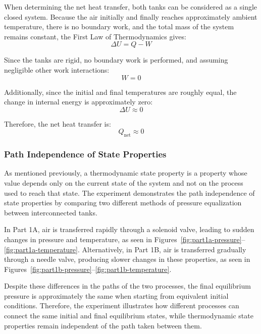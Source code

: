 \documentclass[12pt,letterpaper]{article}
\begin{document}
When determining the net heat transfer, both tanks can be
considered as a single closed system. Because the air
initially and finally reaches approximately ambient
temperature, there is no boundary work, and the total mass
of the system remains constant, the First Law of
Thermodynamics gives:
\begin{equation}
    \Delta U = Q - W
\end{equation}

Since the tanks are rigid, no boundary work is performed,
and assuming negligible other work interactions:
\begin{equation}
    W = 0
\end{equation}

Additionally, since the initial and final temperatures
are roughly equal, the change in internal energy
is approximately zero:
\begin{equation}
    \Delta U \approx 0
\end{equation}

Therefore, the net heat transfer is:
\begin{equation}
    \boxed{Q_{\mathrm{net}} \approx 0}
\end{equation}

\subsubsection{Path Independence of State Properties}
As mentioned previously, a thermodynamic state property is a
property whose value depends only on the current state of the
system and not on the process used to reach that state. The
experiment demonstrates the path independence of state
properties by comparing two different methods of pressure
equalization between interconnected tanks.

In Part 1A, air is transferred rapidly through a solenoid
valve, leading to sudden changes in pressure and temperature,
as seen in Figures~\ref{fig:part1a-pressure}--\ref{fig:part1a-temperature}. Alternatively, in
Part 1B, air is transferred gradually through a needle
valve, producing slower changes in these properties, as
seen in Figures~\ref{fig:part1b-pressure}--\ref{fig:part1b-temperature}.

Despite these differences in the paths of the two processes,
the final equilibrium pressure is approximately the same
when starting from equivalent initial conditions. Therefore,
the experiment illustrates how different processes can
connect the same initial and final equilibrium states,
while thermodynamic state properties remain independent
of the path taken between them.
\end{document}

